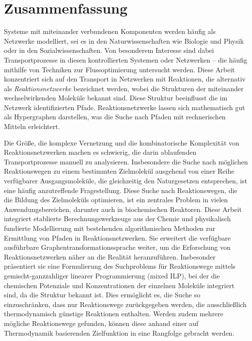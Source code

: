 \chapter{Zusammenfassung}
\label{ch:abstract_de}

Systeme mit miteinander verbundenen Komponenten werden häufig als Netzwerke modelliert, sei es in den Naturwissenschaften wie Biologie und Physik oder in den Sozialwissenschaften. Von besonderem Interesse sind dabei Transportprozesse in diesen kontrollierten Systemen oder Netzwerken – die häufig mithilfe von Techniken zur Flussoptimierung untersucht werden. Diese Arbeit konzentriert sich auf den Transport in Netzwerken mit Reaktionen, die alternativ als \emph{Reaktionsnetzwerke} bezeichnet werden, wobei die Strukturen der miteinander wechselwirkenden Moleküle bekannt sind. Diese Struktur beeinflusst die im Netzwerk identifizierten Pfade. Reaktionsnetzwerke lassen sich mathematisch gut als Hypergraphen darstellen, was die Suche nach Pfaden mit rechnerischen Mitteln erleichtert.

Die Größe, die komplexe Vernetzung und die kombinatorische Komplexität von Reaktionsnetzwerken machen es schwierig, die darin ablaufenden Transportprozesse manuell zu analysieren. Insbesondere die Suche nach möglichen Reaktionswegen zu einem bestimmten Zielmolekül ausgehend von einer Reihe verfügbarer Ausgangsmoleküle, die gleichzeitig den Naturgesetzen entsprechen, ist eine häufig anzutreffende Fragestellung.
Diese Suche nach Reaktionswegen, die die Bildung des Zielmoleküls optimieren, ist ein zentrales Problem in vielen Anwendungsbereichen, darunter auch in biochemischen Reaktoren.
Diese Arbeit integriert etablierte Berechnungswerkzeuge aus der Chemie und physikalisch fundierte Modellierung mit bestehenden algorithmischen Methoden zur Ermittlung von Pfaden in Reaktionsnetzwerken. Sie erweitert die verfügbare ausführbare Graphentransformationssprache weiter, um die Erforschung von Reaktionsnetzwerken näher an die Realität heranzuführen.
Insbesonder präsentiert sie eine Formulierung des Suchproblems für Reaktionswege mittels gemischt-ganzzahliger linearer Programmierung (mixed ILP), bei der die chemischen Potenziale und Konzentrationen der einzelnen Moleküle integriert sind, da die Struktur bekannt ist. Dies ermöglicht es, die Suche so einzuschränken, dass nur Reaktionswege zurückgegeben werden, die ausschließlich thermodynamisch günstige Reaktionen enthalten. Werden zudem mehrere mögliche Reaktionswege gefunden, können diese anhand einer auf Thermodynamik basierenden Zielfunktion in eine Rangfolge gebracht werden. 

